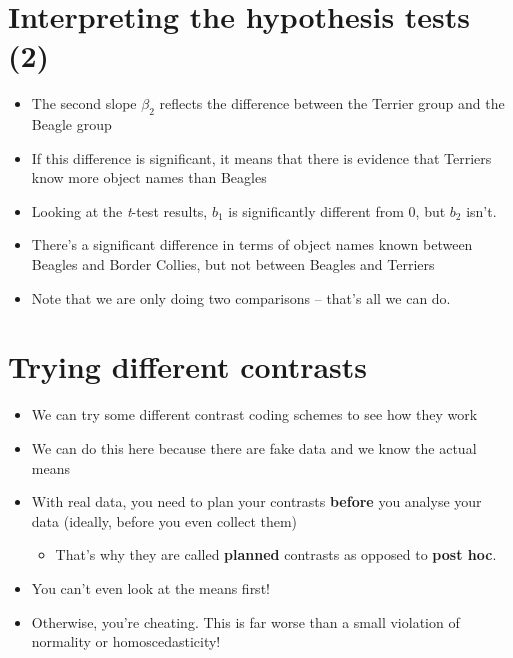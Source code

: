 \documentclass[]{article}
\begin{document}
\section{Interpreting the hypothesis tests
(2)}\label{interpreting-the-hypothesis-tests-2}

\begin{itemize}
\itemsep1pt\parskip0pt
\item
  The second slope $\beta_2$ reflects the difference between the Terrier
  group and the Beagle group
\item
  If this difference is significant, it means that there is evidence
  that Terriers know more object names than Beagles
\item
  Looking at the \emph{t}-test results, $b_1$ is significantly different
  from 0, but $b_2$ isn't.
\item
  There's a significant difference in terms of object names known
  between Beagles and Border Collies, but not between Beagles and
  Terriers
\item
  Note that we are only doing two comparisons -- that's all we can do.
\end{itemize}

\section{Trying different contrasts}\label{trying-different-contrasts}

\begin{itemize}
\itemsep1pt\parskip0pt
\item
  We can try some different contrast coding schemes to see how they work
\item
  We can do this here because there are fake data and we know the actual
  means
\item
  With real data, you need to plan your contrasts \textbf{before} you
  analyse your data (ideally, before you even collect them)

  \begin{itemize}
  \itemsep1pt\parskip0pt
  \item
    That's why they are called \textbf{planned} contrasts as opposed to
    \textbf{post hoc}.
  \end{itemize}
\item
  You can't even look at the means first!
\item
  Otherwise, you're cheating. This is far worse than a small violation
  of normality or homoscedasticity!
\end{itemize}
\end{document}
